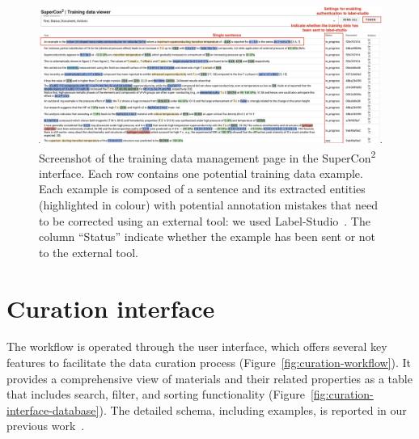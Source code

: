 \begin{figure}[htpb]
  \centering
  \includegraphics[width=1\textwidth]{figures/curation/training-data-viewer} 
  \caption{Screenshot of the training data management page in the SuperCon\textsuperscript{2} interface. Each row contains one potential training data example. Each example is composed of a sentence and its extracted entities (highlighted in colour) with potential annotation mistakes that need to be corrected using an external tool: we used Label-Studio~\cite{Label_Studio}. The column ``Status'' indicate whether the example has been sent or not to the external tool.}
  \label{fig:training-data-view}
\end{figure}

\section{Curation interface}
\label{sec:user-interface}

The workflow is operated through the user interface, which offers several key features to facilitate the data curation process (Figure~\ref{fig:curation-workflow}).
It provides a comprehensive view of materials and their related properties as a table that includes search, filter, and sorting functionality (Figure~\ref{fig:curation-interface-database}). 
The detailed schema, including examples, is reported in our previous work~\cite{foppiano2023automatic}.

